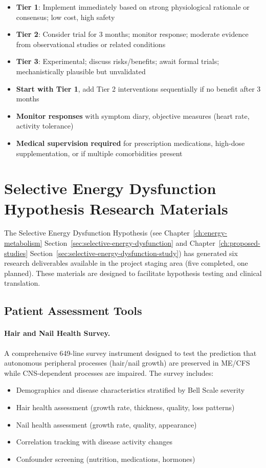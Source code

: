 \begin{itemize}
    \item \textbf{Tier 1}: Implement immediately based on strong physiological rationale or consensus; low cost, high safety
    \item \textbf{Tier 2}: Consider trial for 3 months; monitor response; moderate evidence from observational studies or related conditions
    \item \textbf{Tier 3}: Experimental; discuss risks/benefits; await formal trials; mechanistically plausible but unvalidated
    \item \textbf{Start with Tier 1}, add Tier 2 interventions sequentially if no benefit after 3 months
    \item \textbf{Monitor responses} with symptom diary, objective measures (heart rate, activity tolerance)
    \item \textbf{Medical supervision required} for prescription medications, high-dose supplementation, or if multiple comorbidities present
\end{itemize}

\section{Selective Energy Dysfunction Hypothesis Research Materials}
\label{sec:selective-dysfunction-materials}

The Selective Energy Dysfunction Hypothesis (see Chapter~\ref{ch:energy-metabolism} Section~\ref{sec:selective-energy-dysfunction} and Chapter~\ref{ch:proposed-studies} Section~\ref{sec:selective-energy-dysfunction-study}) has generated six research deliverables available in the project staging area (five completed, one planned). These materials are designed to facilitate hypothesis testing and clinical translation.

\subsection{Patient Assessment Tools}

\paragraph{Hair and Nail Health Survey.}
A comprehensive 649-line survey instrument designed to test the prediction that autonomous peripheral processes (hair/nail growth) are preserved in ME/CFS while CNS-dependent processes are impaired. The survey includes:
\begin{itemize}
    \item Demographics and disease characteristics stratified by Bell Scale severity
    \item Hair health assessment (growth rate, thickness, quality, loss patterns)
    \item Nail health assessment (growth rate, quality, appearance)
    \item Correlation tracking with disease activity changes
    \item Confounder screening (nutrition, medications, hormones)
\end{itemize}

